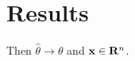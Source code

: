\providecommand{\R}{\mathbf{R}}
\section{Results}
Then $\hat{\theta} \to \theta$ and $\vect{x} \in \R^{n}$.
